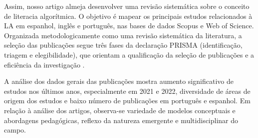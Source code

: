 Assim, nosso artigo almeja desenvolver uma revisão sistemática sobre o
conceito de literacia algorítmica. O objetivo é mapear os principais
estudos relacionados à LA em espanhol, inglês e português, nas bases de
dados Scopus e Web of Science. Organizada metodologicamente como uma
revisão sistemática da literatura, a seleção das publicações segue três
fases da declaração PRISMA (identificação, triagem e elegibilidade), que
orientam a qualificação da seleção de publicações e a eficiência da
investigação \cite{Moher2009}.

A análise dos dados gerais das publicações mostra aumento significativo
de estudos nos últimos anos, especialmente em 2021 e 2022, diversidade
de áreas de origem dos estudos e baixo número de publicações em
português e espanhol. Em relação à análise dos artigos, observa-se
variedade de modelos conceptuais e abordagens pedagógicas, reflexo da
natureza emergente e multidisciplinar do campo.